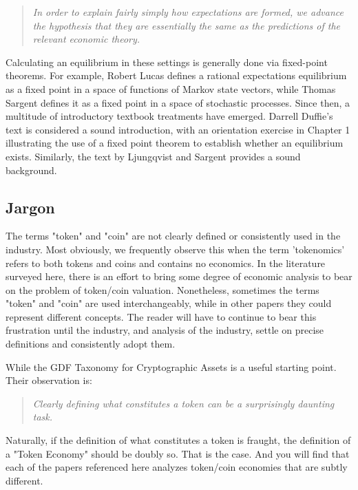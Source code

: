\documentclass[11pt]{article}
\begin{document}
\begin{quote}
    \textit{In order to explain fairly simply how expectations are formed, we advance the hypothesis that they are essentially the same as the predictions of the relevant economic theory.}
\end{quote}

Calculating an equilibrium in these settings is generally done via fixed-point theorems.  For example, Robert Lucas\autocite{lucas72} defines a rational expectations equilibrium as a fixed point in a space of functions of Markov state vectors, while Thomas Sargent\autocite{sargent71} defines it as a fixed point in a space of stochastic processes. Since then, a multitude of introductory textbook treatments have emerged. Darrell Duffie's text\autocite{duffie01} is considered a sound introduction, with an orientation exercise in Chapter 1 illustrating the use of a fixed point theorem to establish whether an equilibrium exists. Similarly, the text\autocite{ljungqvist18} by Ljungqvist and Sargent provides a sound background.

\subsection{Jargon}

The terms "token" and "coin" are not clearly defined or consistently used in the industry. Most obviously, we frequently observe this when the term 'tokenomics' refers to both tokens and coins and contains no economics. In the literature surveyed here, there is an effort to bring some degree of economic analysis to bear on the problem of token/coin valuation. Nonetheless, sometimes the terms "token" and "coin" are used interchangeably, while in other papers they could represent different concepts.  
The reader will have to continue to bear this frustration until the industry, and analysis of the industry, settle on precise definitions and consistently adopt them. 

While the GDF Taxonomy for Cryptographic Assets\autocite{gbbc19a} is a useful starting point. Their observation is:

\begin{quote}
    \textit{Clearly defining what constitutes a token can be a surprisingly daunting task.}
\end{quote}

Naturally, if the definition of what constitutes a token is fraught, the definition of a "Token Economy" should be doubly so. That is the case. And you will find that each of the papers referenced here analyzes token/coin economies that are subtly different.
\end{document}
